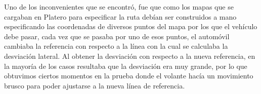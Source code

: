 Uno de los inconvenientes que se encontró, fue que como los mapas que se cargaban en Platero para especificar la ruta debían ser construidos a mano especificando las coordenadas de diversos puntos del mapa por los que el vehículo debe pasar, cada vez que se pasaba por uno de esos puntos, el automóvil cambiaba la referencia con respecto a la línea con la cual se calculaba la desviación lateral. Al obtener la desviación con respecto a la nueva referencia, en la mayoría de los casos resultaba que la desviación era muy grande, por lo que obtuvimos ciertos momentos en la prueba donde el volante hacía un movimiento brusco para poder ajustarse a la nueva línea de referencia.